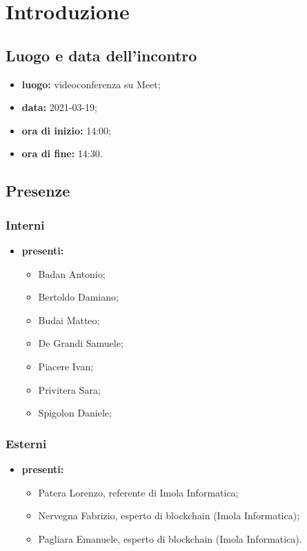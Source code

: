 \section*{Introduzione}
\subsection*{Luogo e data dell'incontro}
\begin{itemize}
	\item \textbf{luogo:} videoconferenza su Meet;
	\item \textbf{data:} 2021-03-19;
	\item \textbf{ora di inizio:} 14:00;
	\item \textbf{ora di fine:} 14:30.
\end{itemize}
\subsection*{Presenze}
\subsubsection*{Interni}
\begin{itemize}
	\item \textbf{presenti: }
	\begin{itemize}
		\item Badan Antonio;
		\item Bertoldo Damiano;
		\item Budai Matteo;
		\item De Grandi Samuele;
		\item Piacere Ivan;
		\item Privitera Sara;
		\item Spigolon Daniele;
	\end{itemize}
\end{itemize}
\subsubsection*{Esterni}
\begin{itemize}
	\item \textbf{presenti: }
	\begin{itemize}
		\item Patera Lorenzo, referente di Imola Informatica;
		\item Nervegna Fabrizio, esperto di blockchain (Imola Informatica);
		\item Pagliara Emanuele, esperto di blockchain (Imola Informatica).
	\end{itemize}
\end{itemize}
